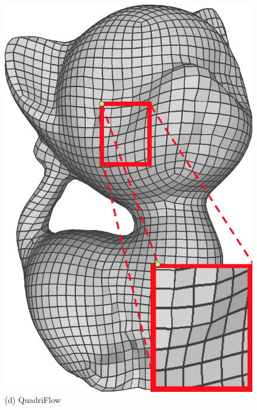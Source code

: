 \begin{figure}
\begin{minipage}{0.16\textwidth}
  \includegraphics[width=\textwidth,height=1.33\textwidth]{quadriflow/result/area03.png}\\
   (d) QuadriFlow
   \end{minipage}
    \begin{minipage}{0.16\textwidth}
     \centering

\end{minipage}
\end{figure}
